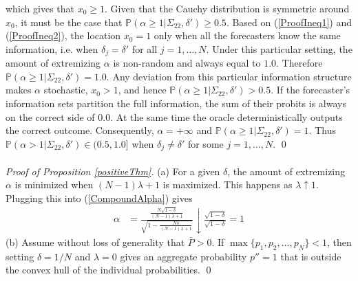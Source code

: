 \documentclass[11pt]{article}
\renewcommand{\P}{\mathbb{P}}
\theoremstyle{definition}
\theoremstyle{definition}
\def\P{{\mathbb P}}
\begin{document}
which gives that $x_0 \geq 1$. Given that the Cauchy distribution is symmetric around $x_0$, it must be the case that $\P(\alpha \geq 1 | \Sigma_{22}, \delta') \geq 0.5$. Based on (\ref{ProofIneq1}) and (\ref{ProofIneq2}), the location $x_0 = 1$ only when all the forecasters know the same information, i.e. when $\delta_j = \delta'$ for all $j = 1, \dots, N$. Under this particular setting, the amount of extremizing $\alpha$ is non-random and always equal to $1.0$. Therefore $\P(\alpha \geq 1 | \Sigma_{22}, \delta') = 1.0$.  Any deviation from this particular information structure makes $\alpha$ stochastic, $x_0 > 1$, and hence $\P(\alpha \geq 1 | \Sigma_{22}, \delta') > 0.5$. If the forecaster's information sets partition the full information, the sum of their probits is always on the correct side of $0.0$. At the same time the oracle deterministically outputs the correct outcome. Consequently, $\alpha = +\infty$ and $\P(\alpha \geq 1 | \Sigma_{22}, \delta') = 1$. Thus $\P(\alpha > 1 | \Sigma_{22}, \delta') \in (0.5, 1.0]$ when $\delta_j \neq \delta'$ for some $j = 1, \dots, N$. \qed
\\
\\
\noindent
\textit{Proof of Proposition \ref{positiveThm}.} (a) For a given $\delta$, the amount of extremizing $\alpha$ is minimized when $(N-1)\lambda +1$ is maximized. This happens as $\lambda \uparrow 1$. Plugging this into (\ref{CompoundAlpha}) gives
\begin{align*}
\alpha &= \frac{\frac{N\sqrt{1-\delta}}{(N-1)\lambda +1}}{\sqrt{1- \frac{N\delta}{(N-1)\lambda +1} }}  \downarrow \frac{\sqrt{1-\delta}}{\sqrt{1-\delta }} = 1
\end{align*}
(b) Assume without loss of generality that $\bar{P} > 0$. If $\max\{p_1, p_2, \dots, p_N \} < 1$, then  setting $\delta = 1/N$ and $\lambda = 0$ gives an aggregate probability $p'' = 1$ that is outside the convex hull of the individual probabilities.
\qed
\end{document}
